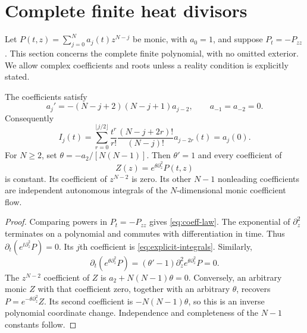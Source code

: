 \section{Complete finite heat divisors}
\label{sec:finite}

Let $P(t,z)=\sum_{j=0}^N a_j(t)z^{N-j}$ be monic, with $a_0=1$,
and suppose $P_t=-P_{zz}$. This section concerns the complete finite
polynomial, with no omitted exterior. We allow complex coefficients
and roots unless a reality condition is explicitly stated.

\begin{theorem}
\label{thm:finite}
The coefficients satisfy
\begin{equation}
 a_j'=-(N-j+2)(N-j+1)a_{j-2},\qquad a_{-1}=a_{-2}=0.
 \label{eq:coeff-law}
\end{equation}
Consequently
\begin{equation}
 I_j(t)=\sum_{r=0}^{\lfloor j/2\rfloor}
 \frac{t^r}{r!}\frac{(N-j+2r)!}{(N-j)!}a_{j-2r}(t)=a_j(0).
 \label{eq:explicit-integrals}
\end{equation}
For $N\ge2$, set $\theta=-a_2/[N(N-1)]$. Then $\theta'=1$ and
every coefficient of
\begin{equation}
 Z(z)=e^{\theta\partial_z^2}P(t,z)
 \label{eq:autonomous}
\end{equation}
is constant. Its coefficient of $z^{N-2}$ is zero. Its other $N-1$
nonleading coefficients are independent autonomous integrals of the
$N$-dimensional monic coefficient flow.
\end{theorem}
\begin{proof}
Comparing powers in $P_t=-P_{zz}$ gives \eqref{eq:coeff-law}.
The exponential of $\partial_z^2$ terminates on a polynomial and
commutes with differentiation in time. Thus
$\partial_t(e^{t\partial_z^2}P)=0$. Its $j$th coefficient is
\eqref{eq:explicit-integrals}. Similarly,
\[
 \partial_t(e^{\theta\partial_z^2}P)
 =(\theta'-1)\partial_z^2e^{\theta\partial_z^2}P=0.
\]
The $z^{N-2}$ coefficient of $Z$ is $a_2+N(N-1)\theta=0$.
Conversely, an arbitrary monic $Z$ with that coefficient zero,
together with an arbitrary $\theta$, recovers
$P=e^{-\theta\partial_z^2}Z$. Its second coefficient is
$-N(N-1)\theta$, so this is an inverse polynomial coordinate change.
Independence and completeness of the $N-1$ constants follow.
\end{proof}

